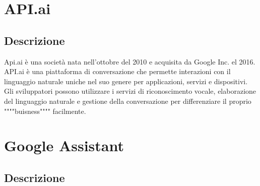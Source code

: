 \documentclass[a4paper,titlepage]{article}
\begin{document}
\section{API.ai}
	\subsection{Descrizione}
Api.ai è una società nata nell'ottobre del 2010 e acquisita da Google Inc. el 2016.\\
API.ai è una piattaforma di conversazione che permette interazioni con il linguaggio naturale uniche nel suo genere per applicazioni, servizi e dispositivi. Gli sviluppatori possono utilizzare i servizi di riconoscimento vocale, elaborazione del linguaggio naturale e gestione della conversazione per differenziare il proprio """"buisness"""" facilmente.

\section{Google Assistant}
\subsection{Descrizione}
\end{document}
